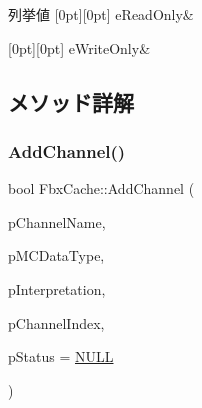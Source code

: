 \begin{DoxyEnumFields}{列挙値}
[0pt][0pt]{}\mbox{\label{class_fbx_cache_a92f455159736ec2cdc0c282af9dbd139acfeade2d8bab8a3b915f8064991cc007}} 
e\+Read\+Only&\\
\hline

[0pt][0pt]{}\mbox{\label{class_fbx_cache_a92f455159736ec2cdc0c282af9dbd139af48325666196336ed9c672386686ef63}} 
e\+Write\+Only&\\
\hline

\end{DoxyEnumFields}


\subsection{メソッド詳解}
\mbox{\label{class_fbx_cache_a5cc3311b704a1405aae637cd8a30e1c8}} 
\subsubsection{\texorpdfstring{Add\+Channel()}{AddChannel()}}
{\footnotesize\ttfamily bool Fbx\+Cache\+::\+Add\+Channel (\begin{DoxyParamCaption}\item[{const char $\ast$}]{p\+Channel\+Name,  }\item[{\hyperlink{class_fbx_cache_a80f82fa5f485ff6c46565ffb151998b3}{E\+M\+C\+Data\+Type}}]{p\+M\+C\+Data\+Type,  }\item[{const char $\ast$}]{p\+Interpretation,  }\item[{unsigned int \&}]{p\+Channel\+Index,  }\item[{\hyperlink{class_fbx_status}{Fbx\+Status} $\ast$}]{p\+Status = {\ttfamily \hyperlink{fbxarch_8h_a070d2ce7b6bb7e5c05602aa8c308d0c4}{N\+U\+LL}} }\end{DoxyParamCaption})}

